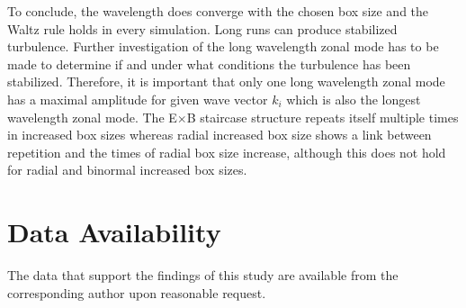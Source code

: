 \documentclass[aip, amsmath, amssymb, reprint, twocolumn]{revtex4-1}
\newcommand{\includegraphicsTwoCol}[4]{
	\onecolumngrid
	\begin{center}
		\captionsetup{type=figure}
    	\texttt{[image: \#1]}
		\captionof{figure}{#2}
    	\label{#3}
	\end{center}
	\twocolumngrid
	\increasecounter{fig}{2}
}
\begin{document}



\bigskip
\bigskip
\bigskip
\bigskip
\bigskip
\bigskip
To conclude, the wavelength does converge with the chosen box size and the Waltz rule holds in every simulation. Long runs can produce stabilized turbulence. Further investigation of the long wavelength zonal mode has to be made to determine if and under what conditions the turbulence has been stabilized. Therefore, it is important that only one long wavelength zonal mode has a maximal amplitude for given wave vector $k_i$ which is also the longest wavelength zonal mode. The E$\times$B staircase structure repeats itself multiple times in increased box sizes whereas radial increased box size shows a link between repetition and the times of radial box size increase, although this does not hold for radial and binormal increased box sizes. 



\section*{Data Availability}
The data that support the findings of this study are available from the corresponding author upon reasonable request. 
\bigskip
\bigskip
\bigskip
\bigskip
\bigskip
\bigskip




\nocite{}
\end{document}
